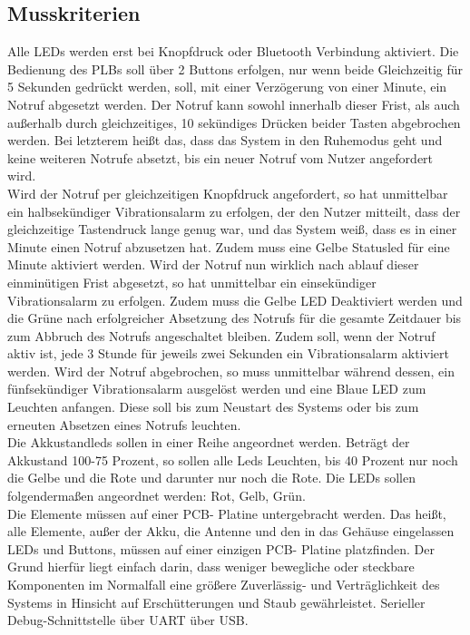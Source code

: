 \documentclass[a4paper]{scrreprt}
\begin{document}
\subsection{Musskriterien}
Alle LEDs werden erst bei Knopfdruck oder Bluetooth Verbindung aktiviert.
Die Bedienung des PLBs soll über 2 Buttons erfolgen, nur wenn beide Gleichzeitig für 5 Sekunden gedrückt werden, soll, mit einer Verzögerung von einer Minute, ein Notruf abgesetzt werden. Der Notruf kann sowohl innerhalb dieser Frist, als auch außerhalb durch gleichzeitiges, 10 sekündiges Drücken beider Tasten abgebrochen werden. Bei letzterem heißt das, dass das System in den Ruhemodus geht und keine weiteren Notrufe absetzt, bis ein neuer Notruf vom Nutzer angefordert wird.\\
Wird der Notruf per gleichzeitigen Knopfdruck angefordert, so hat unmittelbar ein halbsekündiger Vibrationsalarm zu erfolgen, der den Nutzer mitteilt, dass der gleichzeitige Tastendruck lange genug war, und das System weiß, dass es in einer Minute einen Notruf abzusetzen hat. Zudem muss eine Gelbe Statusled für eine Minute aktiviert werden. Wird der Notruf nun wirklich nach ablauf dieser einminütigen Frist abgesetzt, so hat unmittelbar ein einsekündiger Vibrationsalarm zu erfolgen. Zudem muss die Gelbe LED Deaktiviert werden und die Grüne nach erfolgreicher Absetzung des Notrufs für die gesamte Zeitdauer bis zum Abbruch des Notrufs angeschaltet bleiben. Zudem soll, wenn der Notruf aktiv ist, jede 3 Stunde für jeweils zwei Sekunden ein Vibrationsalarm aktiviert werden. Wird der Notruf abgebrochen, so muss unmittelbar während dessen, ein fünfsekündiger Vibrationsalarm ausgelöst werden und eine Blaue LED zum Leuchten anfangen. Diese soll bis zum Neustart des Systems oder bis zum erneuten Absetzen eines Notrufs leuchten.
\\Die Akkustandleds sollen in einer Reihe angeordnet werden. Beträgt der Akkustand 100-75 Prozent, so sollen alle Leds Leuchten, bis 40 Prozent nur noch die Gelbe und die Rote und darunter nur noch die Rote. Die LEDs sollen folgendermaßen angeordnet werden: Rot, Gelb, Grün.\\ 
Die Elemente müssen auf einer PCB- Platine untergebracht werden. Das heißt, alle Elemente, außer der Akku, die Antenne und den in das Gehäuse eingelassen LEDs und Buttons, müssen auf einer einzigen PCB- Platine platzfinden. Der Grund hierfür liegt einfach darin, dass weniger bewegliche oder steckbare Komponenten im Normalfall eine größere Zuverlässig- und Verträglichkeit des Systems in Hinsicht auf Erschütterungen und Staub gewährleistet. Serieller Debug-Schnittstelle über UART über USB.
\end{document}

